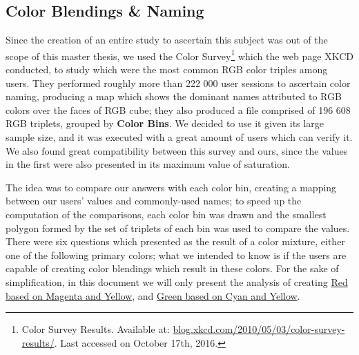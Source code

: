 \subsection{Color Blendings \& Naming}
%
Since the creation of an entire study to ascertain this subject was out of the scope of this master
thesis, we used the Color Survey\footnote{Color Survey Results. Available at:
\url{blog.xkcd.com/2010/05/03/color-survey-results/}. Last accessed on October 17th, 2016.} which the web
page XKCD conducted, to study which were the most common RGB color triples among users. They performed
roughly more than 222 000 user sessions to ascertain color naming, producing a map which shows the
dominant names attributed to RGB colors over the faces of RGB cube; they also produced a file comprised
of 196 608 RGB triplets, grouped by \textbf{Color Bins}. We decided to use it given its large sample size,
and it was executed with a great amount of users which can verify it. We also found great compatibility
between this survey and ours, since the values in the first were also presented in its maximum value of
saturation. \par
%
The idea was to compare our answers with each color bin, creating a mapping between our users' values
and commonly-used names; to speed up the computation of the comparisons, each color bin was drawn and
the smallest polygon formed by the set of triplets of each bin was used to compare the values. There
were six questions which presented as the result of a color mixture, either one of the following
primary colors; what we intended to know is if the users are capable of creating color blendings
which result in these colors. For the sake of simplification, in this document we will only present
the analysis of creating \ul{Red based on Magenta and Yellow}, and \ul{Green based on Cyan and Yellow}.
%

